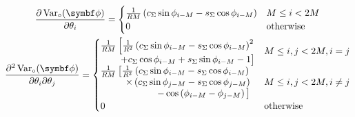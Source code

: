 \begin{subequations}
    \begin{gather}
        \frac{\partial \circvar}{\partial \theta_i} =
        \begin{cases}
            \frac{1}{RM}
            \left(
                c_{\Sigma} \sin \phi_{i-M} -
                s_{\Sigma} \cos \phi_{i-M}
            \right) & M \leq i < 2M\\
            0 & \text{otherwise}
        \end{cases}\\
        \frac{\partial^2 \circvar}{\partial \theta_i \partial \theta_j} =
        \begin{cases}
            \begin{split}
                \tfrac{1}{RM}\left[
                    \tfrac{1}{R^2}
                    \left(c_{\Sigma} \sin \phi_{i-M}  - s_{\Sigma} \cos \phi_{i-M} \right)^2 \right. \\
                    \left. + c_{\Sigma} \cos \phi_{i-M} + s_{\Sigma} \sin \phi_{i-M}
                    - 1
                \vphantom{\tfrac{1}{RM}}\right]
            \end{split}
            & M \leq i, j < 2M, i = j\\
            \begin{split}
                \tfrac{1}{RM}\left[
                    \tfrac{1}{R^2}
                    \left(c_{\Sigma} \sin \phi_{i-M} - s_{\Sigma} \cos \phi_{i-M} \right) \right.\\
                    \times \left(c_{\Sigma} \sin \phi_{j-M} - s_{\Sigma} \cos \phi_{j-M} \right) \\
                    \left. - \cos\left( \phi_{i-M} - \phi_{j-M} \right)
                    \vphantom{\tfrac{1}{R^2}}
                \right]
            \end{split}
            & M \leq i, j < 2M, i \neq j\\
            0 & \text{otherwise}
        \end{cases}
    \end{gather}
\end{subequations}

